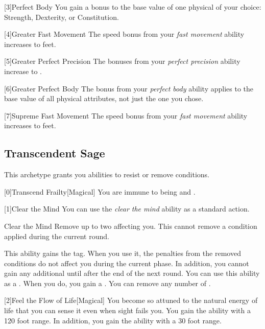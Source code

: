         [3]{Perfect Body} You gain a  bonus to the base value of one physical  of your choice: Strength, Dexterity, or Constitution.

        [4]{Greater Fast Movement} The speed bonus from your \textit{fast movement} ability increases to  feet.

        [5]{Greater Perfect Precision} The bonuses from your \textit{perfect precision} ability increase to .

        [6]{Greater Perfect Body} The bonus from your \textit{perfect body} ability applies to the base value of all physical attributes, not just the one you chose.

        [7]{Supreme Fast Movement} The speed bonus from your \textit{fast movement} ability increases to  feet.

    \newpage
    \subsection{Transcendent Sage}
        This archetype grants you abilities to resist or remove conditions.

        [0]{Transcend Frailty}[Magical]
        You are immune to being  and .

        [1]{Clear the Mind} You can use the \textit{clear the mind} ability as a standard action.
        \begin{freeability}{Clear the Mind}
            Remove up to two  affecting you.
            This cannot remove a condition applied during the current round.

            \rankline
             This ability gains the  tag.
            When you use it, the penalties from the removed conditions do not affect you during the current phase.
            In addition, you cannot gain any additional  until after the end of the next round.
             You can use this ability as a .
            When you do, you gain a .
             You can remove any number of .
        \end{freeability}

        [2]{Feel the Flow of Life}[Magical] You become so attuned to the natural energy of life that you can sense it even when sight fails you.
        You gain the  ability with a 120 foot range.
        In addition, you gain the  ability with a 30 foot range.

